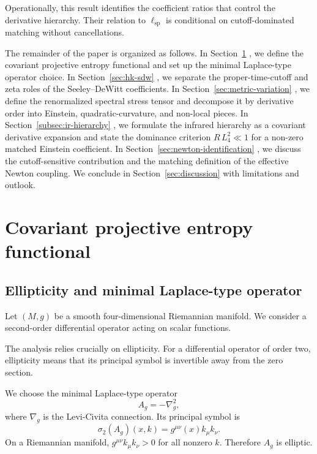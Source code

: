 \documentclass[pdflatex,sn-mathphys-num]{sn-jnl} %
\theoremstyle{remark}
\theoremstyle{plain}
\begin{document}
      Operationally, this result identifies the coefficient ratios that control the derivative hierarchy.
      Their relation to $\ell_{\mathrm{sp}}$ is conditional on cutoff-dominated matching without cancellations.

      The remainder of the paper is organized as follows.
      In Section~\ref{sec:projective-entropy-covariant}
      , we define the covariant projective entropy functional and set up the
      minimal Laplace-type operator choice.
      In Section~\ref{sec:hk-sdw}
      , we separate the proper-time-cutoff and zeta roles of the Seeley--DeWitt coefficients.
      In Section~\ref{sec:metric-variation}
      , we define the renormalized spectral stress tensor and decompose it by derivative
      order into Einstein, quadratic-curvature, and non-local pieces.
      In Section~\ref{subsec:ir-hierarchy}
      , we formulate the infrared hierarchy as a covariant derivative expansion and
      state the dominance criterion \(R\,L_4^2\ll 1\) for a non-zero matched Einstein coefficient.
      In Section~\ref{sec:newton-identification}
      , we discuss the cutoff-sensitive contribution and the matching definition of the effective Newton coupling.
      We conclude in Section~\ref{sec:discussion} with limitations and outlook.

  \section{Covariant projective entropy functional}
  \label{sec:projective-entropy-covariant}

  \subsection{Ellipticity and minimal Laplace-type operator}
    \label{subsec:ellipticity}

    Let $(M,g)$ be a smooth four-dimensional Riemannian manifold.
    We consider a second-order differential operator acting on scalar functions.

    The analysis relies crucially on ellipticity.
    For a differential operator of order two, ellipticity means that its
    principal symbol is invertible away from the zero section.

    We choose the minimal Laplace-type operator
    \begin{equation}
      A_g = -\nabla_g^2 ,
    \end{equation}
    where $\nabla_g$ is the Levi-Civita connection.
    Its principal symbol is
    \begin{equation}
      \sigma_2(A_g)(x,k) = g^{\mu\nu}(x) k_\mu k_\nu .
    \end{equation}
    On a Riemannian manifold, $g^{\mu\nu}k_\mu k_\nu>0$ for all nonzero $k$.
    Therefore $A_g$ is elliptic.
\end{document}
